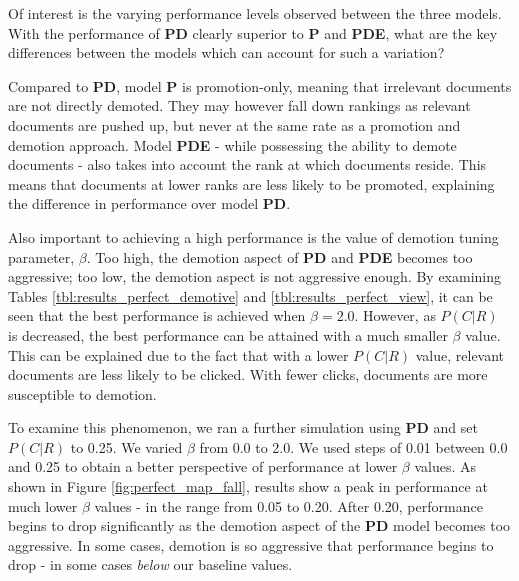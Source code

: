 Of interest is the varying performance levels observed between the three models. With the performance of \textbf{PD} clearly superior to \textbf{P} and \textbf{PDE}, what are the key differences between the models which can account for such a variation?

Compared to \textbf{PD}, model \textbf{P} is promotion-only, meaning that irrelevant documents are not directly demoted. They may however fall down rankings as relevant documents are pushed up, but never at the same rate as a promotion and demotion approach. Model \textbf{PDE} -  while possessing the ability to demote documents - also takes into account the rank at which documents reside. This means that documents at lower ranks are less likely to be promoted, explaining the difference in performance over model \textbf{PD}.

Also important to achieving a high performance is the value of demotion tuning parameter, $\beta$. Too high, the demotion aspect of \textbf{PD} and \textbf{PDE} becomes too aggressive; too low, the demotion aspect is not aggressive enough. By examining Tables \ref{tbl:results_perfect_demotive} and \ref{tbl:results_perfect_view}, it can be seen that the best performance is achieved when $\beta = 2.0$. However, as $P(C|R)$ is decreased, the best performance can be attained with a much smaller $\beta$ value. This can be explained due to the fact that with a lower $P(C|R)$ value, relevant documents are less likely to be clicked. With fewer clicks, documents are more susceptible to demotion.

To examine this phenomenon, we ran a further simulation using \textbf{PD} and set $P(C|R)$ to 0.25. We varied $\beta$ from 0.0 to 2.0. We used steps of 0.01 between 0.0 and 0.25 to obtain a better perspective of performance at lower $\beta$ values.  As shown in Figure \ref{fig:perfect_map_fall}, results show a peak in performance at much lower $\beta$ values - in the range from 0.05 to 0.20. After 0.20, performance begins to drop significantly as the demotion aspect of the \textbf{PD} model becomes too aggressive. In some cases, demotion is so aggressive that performance begins to drop - in some cases \emph{below} our baseline values.
 
